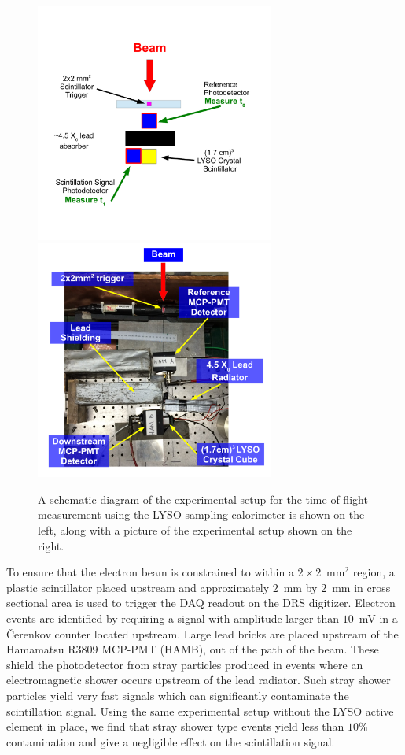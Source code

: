 \begin{figure}[h] \centering
\includegraphics[width=0.7\textwidth]{figs/timing/LYSOSamplingCaloSetupSchematic} \\
\includegraphics[width=0.7\textwidth]{figs/timing/LYSOSamplingCaloSetupPhoto} 
\caption{  A schematic diagram of the experimental setup for the
time of flight measurement using the LYSO sampling calorimeter is shown
on the left, along with a picture of the experimental setup shown on the right. } 
\label{fig:LYSOSamplingCaloSetup}
\end{figure}

To ensure that the electron beam is constrained to within a $2\times 2$~mm$^2$ region, 
a plastic scintillator placed upstream and approximately $2$~mm by $2$~mm in cross sectional 
area is used to trigger the DAQ readout on the DRS  digitizer. Electron events are identified 
by requiring a signal with amplitude larger than $10$~mV in a \v{C}erenkov counter located 
upstream. Large lead bricks are placed upstream of the Hamamatsu R3809 MCP-PMT (HAMB),
out of the path of the beam. These shield the photodetector from stray particles
produced in events where an electromagnetic shower occurs upstream of the lead
radiator. Such stray shower particles yield very fast signals which can
significantly contaminate the scintillation signal. Using the same experimental
setup without the LYSO active element in place, we find that stray shower type
events yield less than $10\%$ contamination and give a negligible effect on the
scintillation signal. 


